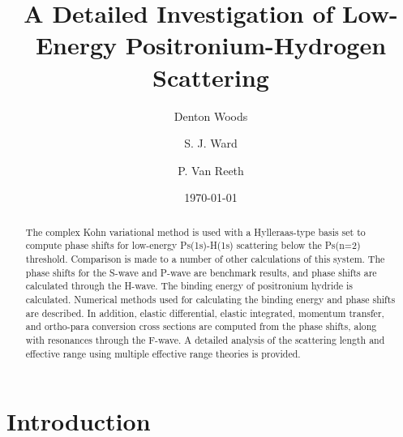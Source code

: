 \documentclass[preprint,showpacs,preprintnumbers,amsmath,amssymb,longbibliography,pra,aps]{revtex4-1}
\begin{document}

\title{A Detailed Investigation of Low-Energy Positronium-Hydrogen Scattering}

\author{Denton Woods}
\author{S. J. Ward}

\author{P. Van Reeth}

\date{\today}%

\begin{abstract}
The complex Kohn variational method is used with a Hylleraas-type basis set to compute phase shifts for low-energy Ps(1s)-H(1s) scattering below the Ps(n=2) threshold. Comparison is made to a number of other calculations of this system. The phase shifts for the S-wave and P-wave are benchmark results, and phase shifts are calculated through the H-wave. The binding energy of positronium hydride is calculated. Numerical methods used for calculating the binding energy and phase shifts are described. In addition, elastic differential, elastic integrated, momentum transfer, and ortho-para conversion cross sections are computed from the phase shifts, along with resonances through the F-wave. A detailed analysis of the scattering length and effective range using multiple effective range theories is provided.
\end{abstract}
   
\maketitle

\section{\label{sec:Intro}\protect Introduction}


\end{document}
